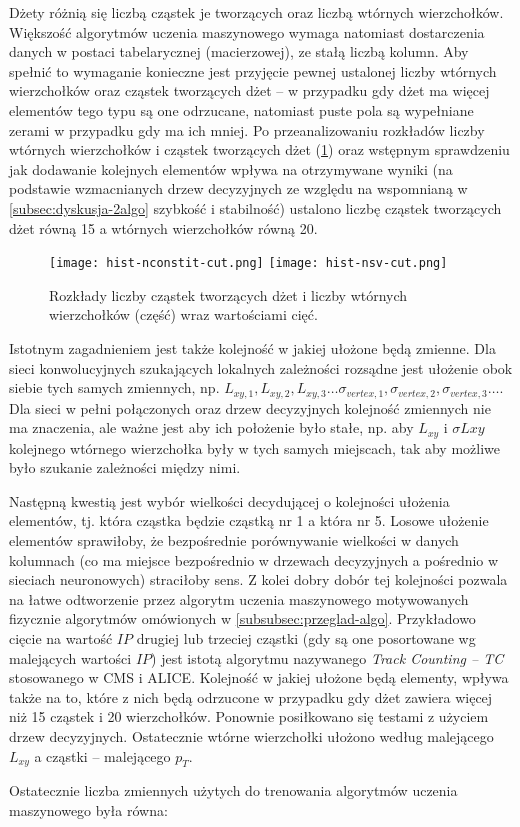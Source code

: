 Dżety różnią się liczbą cząstek je tworzących oraz liczbą wtórnych wierzchołków. Większość algorytmów uczenia maszynowego wymaga natomiast dostarczenia danych w postaci tabelarycznej (macierzowej), ze stałą liczbą kolumn. Aby spełnić to wymaganie konieczne jest przyjęcie pewnej ustalonej liczby wtórnych wierzchołków oraz cząstek tworzących dżet -- w przypadku gdy dżet ma więcej elementów tego typu są one odrzucane, natomiast puste pola są wypełniane zerami w przypadku gdy ma ich mniej. 
Po przeanalizowaniu rozkładów liczby wtórnych wierzchołków i cząstek tworzących dżet (\ref{fig:nsv_nconstit_distr}) oraz wstępnym sprawdzeniu jak dodawanie kolejnych elementów wpływa na otrzymywane wyniki (na podstawie wzmacnianych drzew decyzyjnych ze względu na wspomnianą w \ref{subsec:dyskusja-2algo} szybkość i stabilność) ustalono liczbę cząstek tworzących dżet równą 15 a wtórnych wierzchołków równą 20.

\begin{figure}[h]
	\centering
	\texttt{[image: hist-nconstit-cut.png]}
	\texttt{[image: hist-nsv-cut.png]}
	\caption{Rozkłady liczby cząstek tworzących dżet i liczby wtórnych wierzchołków (część) wraz wartościami cięć.}
	\label{fig:nsv_nconstit_distr}
\end{figure}

Istotnym zagadnieniem jest także kolejność w jakiej ułożone będą zmienne. 
Dla sieci konwolucyjnych szukających lokalnych zależności rozsądne jest ułożenie obok siebie tych samych zmiennych, np. $L_{xy,1}, L_{xy,2}, L_{xy,3} \dots \sigma_{vertex,1}, \sigma_{vertex,2}, \sigma_{vertex,3} \dots$. 
Dla sieci w pełni połączonych oraz drzew decyzyjnych kolejność zmiennych nie ma znaczenia, ale ważne jest aby ich położenie było stałe, np. aby $L_{xy}$ i $\sigma{Lxy}$ kolejnego wtórnego wierzchołka były w tych samych miejscach, tak aby możliwe było szukanie zależności między nimi.

Następną kwestią jest wybór wielkości decydującej o kolejności ułożenia elementów, tj. która cząstka będzie cząstką nr 1 a która nr 5. Losowe ułożenie elementów sprawiłoby, że bezpośrednie porównywanie wielkości w danych kolumnach (co ma miejsce bezpośrednio w drzewach decyzyjnych a pośrednio w sieciach neuronowych) straciłoby sens. Z kolei dobry dobór tej kolejności pozwala na łatwe odtworzenie przez algorytm uczenia maszynowego motywowanych fizycznie algorytmów omówionych w \ref{subsubsec:przeglad-algo}. Przykładowo cięcie na wartość $IP$ drugiej lub trzeciej cząstki (gdy są one posortowane wg malejących wartości $IP$) jest istotą algorytmu nazywanego \textit{Track Counting -- TC} stosowanego w CMS i ALICE.
Kolejność w jakiej ułożone będą elementy, wpływa także na to, które z nich będą odrzucone w przypadku gdy dżet zawiera więcej niż 15 cząstek i 20 wierzchołków. 
Ponownie posiłkowano się testami z użyciem drzew decyzyjnych. Ostatecznie wtórne wierzchołki ułożono według malejącego $L_{xy}$ a cząstki -- malejącego $p_T$.

Ostatecznie liczba zmiennych użytych do trenowania algorytmów uczenia maszynowego była równa: 